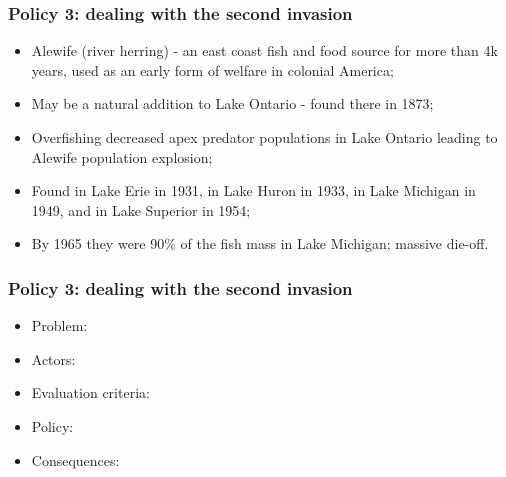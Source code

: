 \documentclass[aspectratio=169]{beamer}
\theoremstyle{principle}
\begin{document}
\begin{frame}
\frametitle{Policy 3: dealing with the second invasion}

\begin{itemize}
\item Alewife (river herring) - an east coast fish and food source for more than 4k years, used as an early form of welfare in colonial America;
\bigskip
\bigskip
\item May be a natural addition to Lake Ontario - found there in 1873;
\bigskip
\bigskip
\item Overfishing decreased apex predator populations in Lake Ontario leading to Alewife population explosion;
\bigskip
\bigskip
\item Found in Lake Erie in 1931, in Lake Huron in 1933, in Lake Michigan in 1949, and in Lake Superior in 1954;
\bigskip
\bigskip
\item By 1965 they were 90\% of the fish mass in Lake Michigan; massive die-off.
\end{itemize}

\end{frame}

\begin{frame}
\frametitle{Policy 3: dealing with the second invasion}

\begin{itemize}
\item Problem: 
\bigskip
\bigskip
\item Actors: 
\bigskip
\bigskip
\item Evaluation criteria: 
\bigskip
\bigskip
\item Policy: 
\bigskip
\bigskip
\item Consequences: 
\end{itemize}
\end{frame}
\end{document}
